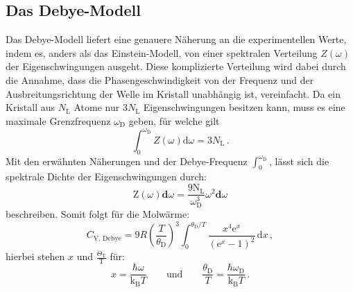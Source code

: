 \subsection{Das Debye-Modell}
Das Debye-Modell liefert eine genauere Näherung an die experimentellen Werte, indem es, anders als das Einstein-Modell, von einer spektralen Verteilung $Z(\omega)$ der Eigenschwingungen ausgeht.
Diese komplizierte Verteilung wird dabei durch die Annahme, dass die Phasengeschwindigkeit von der Frequenz und der Ausbreitungsrichtung der Welle im Kristall unabhängig ist, vereinfacht.
Da ein Kristall aus $N_\text{L}$ Atome nur $3N_\text{L}$ Eigenschwingungen besitzen kann, muss es eine maximale Grenzfrequenz $\omega_\text{D}$ geben, für welche gilt
\begin{equation}
  \int_0^{\omega_\text{D}} Z(\omega)\text{d}\omega = 3N_\text{L}\,.
\end{equation}
Mit den erwähnten Näherungen und der Debye-Frequenz $\int_0^{\omega_\text{D}}$, lässt sich die spektrale Dichte der Eigenschwingungen durch:
\begin{equation}
  \text{Z}(\omega)\textbf{d}\omega= \frac{9\text{N}_\text{L}}{\omega_{\text{D}}^3}\omega^2\textbf{d}\omega
\end{equation}
beschreiben.
Somit folgt für die Molwärme:
\begin{equation}
 C_\text{V, Debye} = 9R \left(\frac{T}{\theta_\text{D}}\right)^3 \int_0^{\theta_\text{D}/T} \frac{x^4\text{e}^x}{(\text{e}^x-1)^2}\,\text{d}x \, ,
\end{equation}
hierbei stehen $x$ und $\frac{\Theta_\text{T}}{\text{T}}$ für:
\begin{equation}
  x = \frac{\hbar\omega}{\text{k}_\text{B}T} \qquad \text{und} \qquad \frac{\theta_\text{D}}{T} = \frac{\hbar\omega_\text{D}}{\text{k}_\text{B}T}\,.
\end{equation}

